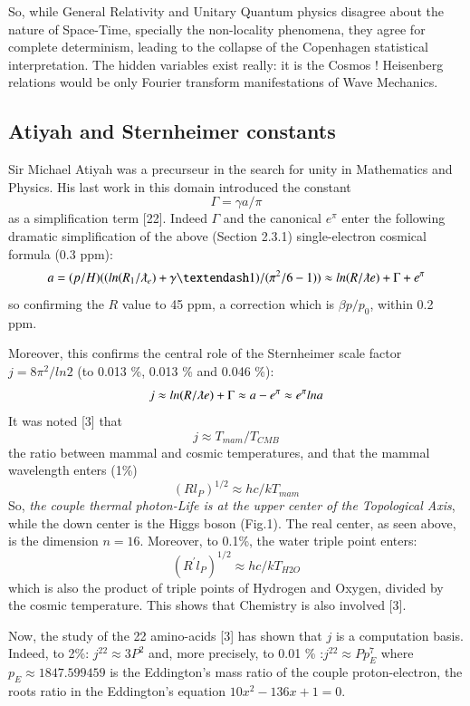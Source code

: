 \documentclass[twoside,draft]{article}
\begin{document}
\begin{sloppypar}
{So, while General Relativity and Unitary Quantum physics disagree about the nature of Space-Time, specially the non-locality phenomena, they agree for complete determinism, leading to the collapse of the
Copenhagen statistical interpretation. The hidden variables exist really: it is the Cosmos ! Heisenberg
relations would be only Fourier transform manifestations of Wave Mechanics.


\subsection{Atiyah and Sternheimer constants}
    Sir Michael Atiyah was a precurseur in the search for unity in Mathematics and Physics. His last work in this domain introduced the constant $$\Gamma = \gamma a /\pi$$ as a simplification term [22]. Indeed $\Gamma$ and the canonical $e^{\pi}$ enter the following dramatic simplification of the above (Section 2.3.1) single-electron cosmical formula (0.3 ppm):    
\begin{equation}
a = (p/H)((ln(R_1/\lambdabar_e) + \gamma – 1)/(\pi^2/6 - 1)) \approx ln(R/\lambdabar e) + \Gamma + e^{\pi}
\end{equation}
so confirming the $R$ value to 45 ppm, a correction which is $\beta p/p_0$, within 0.2 ppm.

Moreover, this confirms the central role of the Sternheimer scale factor $j = 8\pi^2/ln2$ (to 0.013 \%, 0.013 \% and 0.046 \%):
\begin{equation}
j \approx ln(R/\lambdabar e) + \Gamma \approx a - e^{\pi} \approx e^{\pi} lna
\end{equation}
It was noted [3] that $$j\approx T_{mam}/T_{CMB}$$ the ratio between mammal and cosmic temperatures, and that the mammal wavelength enters (1\%) $$(Rl_P)^{1/2}\approx hc/kT_{mam}$$ So, \textit{the couple thermal photon-Life is at the upper center of the Topological Axis}, while the down center is the Higgs boson (Fig.1). The real center, as seen above, is the dimension $n = 16$. Moreover, to 0.1\%, the water triple point enters: $$(R^{\prime}l_P)^{1/2}\approx hc/kT_{H2O}$$ which is also the product of triple points of Hydrogen and Oxygen, divided by the cosmic temperature. This shows that Chemistry is also involved [3].

Now, the study of the 22 amino-acids [3] has shown that $j$ is a computation basis. Indeed, to 2\%: $j^{22} \approx 3 P^2 $ and, more precisely, to 0.01 \% :$j^{22} \approx Pp_E^7 $ where $ p_E \approx 1847.599459$ is the Eddington's mass ratio of the couple proton-electron, the roots ratio in the Eddington's equation $10x^2 - 136x + 1 = 0 $.

}
\end{sloppypar}
\end{document}
